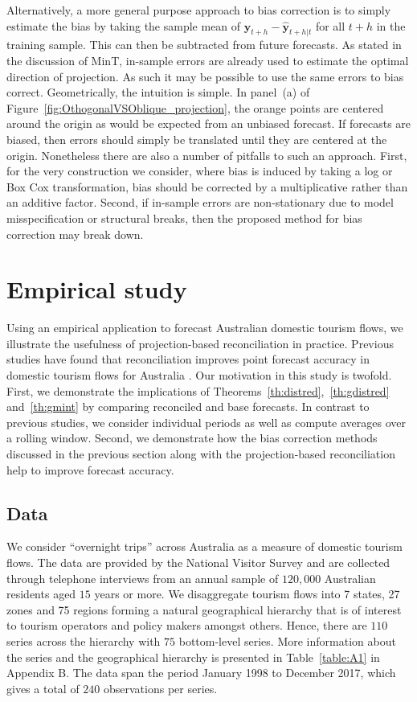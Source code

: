\documentclass[12pt]{article}
\theoremstyle{definition}
\begin{document}
Alternatively, a more general purpose approach to bias correction is to simply estimate the bias by taking the sample mean of $\bm{y}_{t+h}-\hat{\bm{y}}_{t+h|t}$ for all $t+h$ in the training sample. This can then be subtracted from future forecasts. As stated in the discussion of MinT, in-sample errors are already used to estimate the optimal direction of projection. As such it may be possible to use the same errors to bias correct. Geometrically, the intuition is simple. In panel~(a) of Figure~\ref{fig:OthogonalVSOblique_projection}, the orange points are centered around the origin as would be expected from an unbiased forecast. If forecasts are biased, then errors should simply be translated until they are centered at the origin. Nonetheless there are also a number of pitfalls to such an approach. First, for the very construction we consider, where bias is induced by taking a log or Box Cox transformation, bias should be corrected by a multiplicative rather than an additive factor. Second, if in-sample errors are non-stationary due to model misspecification or structural breaks, then the proposed method for bias correction may break down.

\section{Empirical study}\label{sec:EmpStudy}

Using an empirical application to forecast Australian domestic tourism flows, we illustrate the usefulness of projection-based reconciliation in practice. Previous studies have found that reconciliation improves point forecast accuracy in domestic tourism flows for Australia \citep[see for example][]{Athanasopoulos2009, Hyndman2011,WicEtAl2019}. Our motivation in this study is twofold. First, we demonstrate the implications of Theorems~\ref{th:distred}{\color{blue},~\ref{th:gdistred} and~\ref{th:gmint}} by comparing reconciled and base forecasts. In contrast to previous studies, we consider individual periods {\color{blue} as well as} compute averages over a rolling window. Second, we demonstrate how the bias correction methods discussed in the previous section along with the projection-based reconciliation help to improve forecast accuracy.

\subsection{Data}

We consider ``overnight trips'' across Australia as a measure of domestic tourism flows. The data are provided by the National Visitor Survey and are collected through telephone interviews from an annual sample of $120,000$ Australian residents aged $15$ years or more. We disaggregate tourism flows into 7 states, 27 zones and 75 regions forming a natural geographical hierarchy that is of interest to tourism operators and policy makers amongst others. Hence, there are $110$ series across the hierarchy with $75$ bottom-level series. More information about the series and the geographical hierarchy is presented in Table~\ref{table:A1} in Appendix B\@. The data span the period January 1998 to December 2017, which gives a total of $240$ observations per series.
\end{document}
